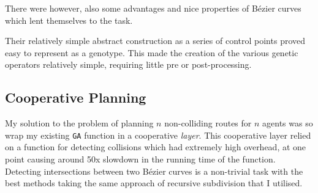 There were however, also some advantages and nice properties of Bézier curves which lent themselves to the task.

Their relatively simple abstract construction as a series of control points proved easy to represent as a genotype. This made the creation of the various genetic operators relatively simple, requiring little pre or post-processing.

\subsection{Cooperative Planning}
\label{subsec:eval-cooperativeplanning}

My solution to the problem of planning $n$ non-colliding routes for $n$ agents was so wrap my existing \texttt{GA} function in a cooperative \textit{layer}. This cooperative layer relied on a function for detecting collisions which had extremely high overhead, at one point causing around 50x slowdown in the running time of the function. Detecting intersections between two Bézier curves is a non-trivial task with the best methods taking the same approach of recursive subdivision that I utilised.





